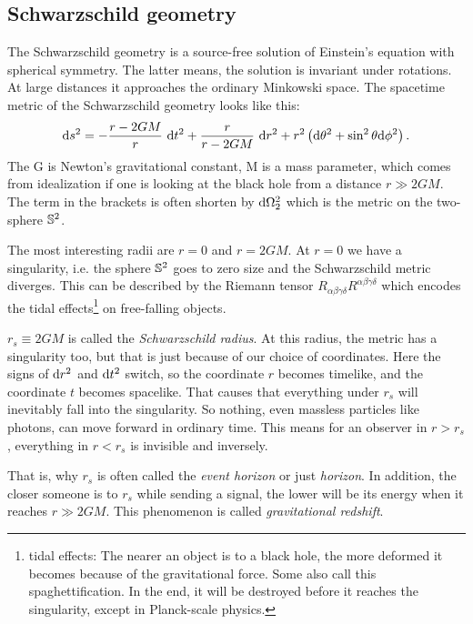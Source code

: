 \subsection{Schwarzschild geometry \checkmark}
	
	The Schwarzschild geometry is a source-free solution of Einstein's equation  with spherical symmetry. The latter means, the solution is invariant under rotations. 
	At large distances it approaches the ordinary Minkowski space.
	The spacetime metric of the Schwarzschild geometry looks like this:\\
		\begin{equation} \label{p.3 (2.1)}
		\mathrm{d} s^2=-\frac{r-2GM}{r}~ \mathrm{d} t^2+\frac{r}{r-2GM}~
		\mathrm{d} r^2+r^2 \left( \mathrm{d} \theta^2+\sin^2\theta \mathrm{d} \phi^2 \right).
		\end{equation}
	The G is Newton's gravitational constant, M is a mass parameter, which comes from idealization if one is looking at the black hole from a distance $r\gg 2GM$.
	The term in the brackets is often shorten by $\mathrm{d} \Omega_2^2$ which is the metric on the two-sphere $\mathbb{S}^2$.
	
	The most interesting radii are $r=0$ and $r=2GM$.
	At $r=0$ we have a singularity, i.e. the sphere $\mathbb{S}^2$ goes to zero size and the Schwarzschild metric diverges.
	This can be described by the Riemann tensor $R_{\alpha\beta\gamma \delta}R^{\alpha\beta\gamma\delta}$ which encodes the tidal effects\footnote{tidal effects: The nearer an object is to a black hole, the more deformed it becomes because of the gravitational force. Some also call this spaghettification. In the end, it will be destroyed before it reaches the singularity, except in Planck-scale physics.} on free-falling objects.
	
	$r_{s}\equiv 2GM$ is called the \textit{Schwarzschild radius}. At this radius, the metric has a singularity too, but that is just because of our choice of coordinates. Here the signs of $\mathrm{d} r^2$ and $\mathrm{d} t^2$ switch, so the coordinate $r$ becomes timelike, and the coordinate $t$ becomes spacelike. That causes that everything under $r_{s}$ will inevitably fall into the singularity. 
	So nothing, even massless particles like photons, can move forward in ordinary time. This means for an observer in $r>r_{s}$, everything in $r<r_{s}$ is invisible and inversely. 
	
	That is, why $r_{s}$ is often called the \textit{event horizon} or just \textit{horizon}.
	In addition, the closer someone is to $r_{s}$ while sending a signal, the lower will be its energy when it reaches $r\gg 2GM$. This phenomenon is called \textit{gravitational redshift}.
